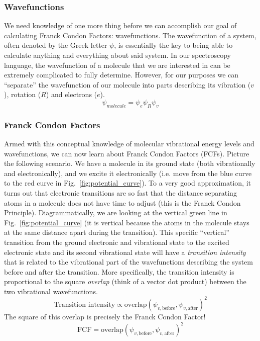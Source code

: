 \documentclass[12pt]{article}
\begin{document}
\subsubsection{Wavefunctions}

We need knowledge of one more thing before we can accomplish our goal of calculating Franck Condon Factors: wavefunctions. The wavefunction of a system, often denoted by the Greek letter $\psi$, is essentially the key to being able to calculate anything and everything about said system. In our spectroscopy language, the wavefunction of a molecule that we are interested in can be extremely complicated to fully determine. However, for our purposes we can ``separate'' the wavefunction of our molecule into parts describing its vibration ($v$), rotation ($R$) and electrons ($e$).
\begin{equation}
    \psi_{molecule} = \psi_e\psi_R\psi_v
\end{equation}

\subsubsection{Franck Condon Factors}

Armed with this conceptual knowledge of molecular vibrational energy levels and wavefunctions, we can now learn about Franck Condon Factors (FCFs). Picture the following scenario. We have a molecule in its ground state (both vibrationally and electronically), and we excite it electronically (i.e. move from the blue curve to the red curve in Fig.~\ref{fig:potential_curve}). To a very good approximation, it turns out that electronic transitions are so fast that the distance separating atoms in a molecule does not have time to adjust (this is the Franck Condon Principle). Diagrammatically, we are looking at the vertical green line in Fig.~\ref{fig:potential_curve} (it is vertical because the atoms in the molecule stays at the same distance apart during the transition). This specific ``vertical'' transition from the ground electronic and vibrational state to the excited electronic state and its second vibrational state will have a \textit{transition intensity} that is related to the vibrational part of the wavefunctions describing the system before and after the transition. More specifically, the transition intensity is proportional to the square \textit{overlap} (think of a vector dot product) between the two vibrational wavefunctions.
\begin{equation}
    \text{Transition}\text{ intensity} \propto \text{overlap}(\psi_{v,\text{before}},\psi_{v,\text{after}})^2
\end{equation}
The square of this overlap is precisely the Franck Condon Factor!
\begin{equation} \label{eq:FCF}
    \text{FCF} = \text{overlap}(\psi_{v,\text{before}},\psi_{v,\text{after}})^2
\end{equation}
\end{document}

